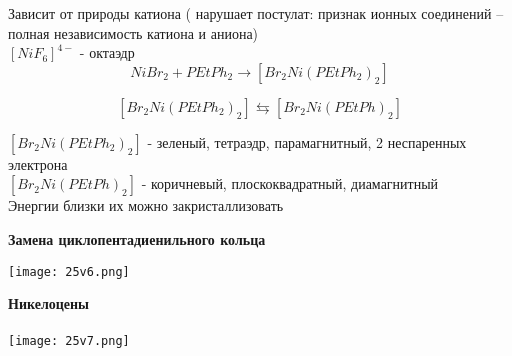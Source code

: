 Зависит от природы катиона ( нарушает постулат:  признак ионных соединений -- полная независимость катиона и аниона)\\

$[NiF_6]^{4-}$ - октаэдр\\

$$NiBr_2 + PEtPh_2 \rightarrow [Br_2Ni(PEtPh_2)_2]$$

$$[Br_2Ni(PEtPh_2)_2] \leftrightarrows [Br_2Ni(PEtPh)_2]$$

$[Br_2Ni(PEtPh_2)_2]$ - зеленый, тетраэдр, парамагнитный, 2 неспаренных электрона\\

$[Br_2Ni(PEtPh)_2]$ - коричневый, плоскоквадратный, диамагнитный\\

Энергии близки их можно закристаллизовать

\textbf{Замена циклопентадиенильного кольца}

\texttt{[image: 25v6.png]}

\textbf{Никелоцены}\\
\\

\texttt{[image: 25v7.png]}

